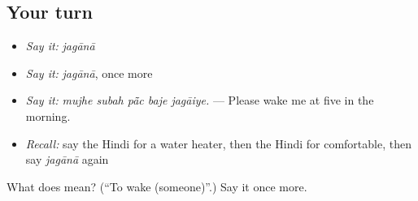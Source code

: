 \subsection*{Your turn}
\begin{itemize}
\raggedright
  \item \emph{Say it:} \emph{jagānā}
  \item \emph{Say it:} \emph{jagānā}, once more
  \item \emph{Say it:} \emph{mujhe subah pā̃c baje jagāiye.} — Please wake me at five in the morning.
  \item \emph{Recall:} say the Hindi for a water heater, then the Hindi for comfortable, then say \emph{jagānā} again
\end{itemize}

\begin{tcolorbox}[breakable,colback=teal!4,colframe=teal!35!black,title={Before you move on}]
What does  mean? (\textquotedblleft{}To wake (someone)\textquotedblright{}.) Say it once more.
\end{tcolorbox}
